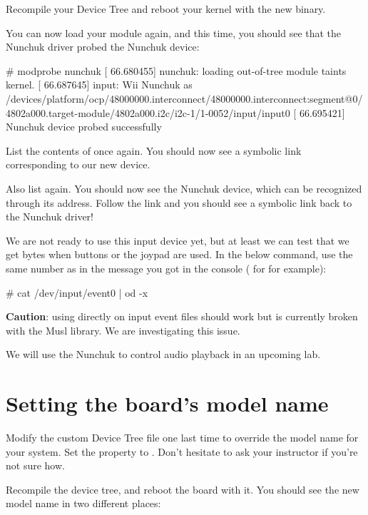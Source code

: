 {Recompile your Device Tree and reboot your kernel with the new binary.

You can now load your module again, and this time, you should see that
the Nunchuk driver probed the Nunchuk device:

\begin{bashinput}
# modprobe nunchuk
[   66.680455] nunchuk: loading out-of-tree module taints kernel.
[   66.687645] input: Wii Nunchuk as /devices/platform/ocp/48000000.interconnect/48000000.interconnect:segment@0/4802a000.target-module/4802a000.i2c/i2c-1/1-0052/input/input0
[   66.695421] Nunchuk device probed successfully
\end{bashinput}

List the contents of  once again. You
should now see a symbolic link corresponding to our new device.

Also list  again. You should now see the
Nunchuk device, which can be recognized through its  address.
Follow the link and you should see a symbolic link back to the Nunchuk
driver!

We are not ready to use this input device yet, but at least we can test
that we get bytes when buttons or the joypad are used. In the below
command, use the same number as in the message you got in the console
( for  for example):

\begin{bashinput}
# cat /dev/input/event0 | od -x
\end{bashinput}

{\bf Caution}: using  directly on input event files should
work but is currently broken with the Musl library. We are investigating
this issue.

We will use the Nunchuk to control audio playback in an upcoming lab.

\section{Setting the board's model name}

Modify the custom Device Tree file one last time to override the model
name for your system. Set the  property to
. Don't hesitate to ask your
instructor if you're not sure how.

Recompile the device tree, and reboot the board with it. You should see
the new model name in two different places:

}
